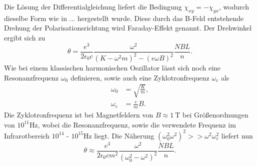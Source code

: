 Die Lösung der Differentialgleichung liefert die Bedingung $\chi_{xy} = -\chi_{yx}$, wodurch dieselbe Form wie in ... hergestellt wurde.
Diese durch das B-Feld entstehende Drehung der Polarisationsrichtung wird Faraday-Effekt genannt.
Der Drehwinkel ergibt sich zu
\begin{equation}
\theta = \frac{e^3}{2 \epsilon_0 c} \frac{\omega^2}{(K - \omega^2 m)^2 - (e\omega B)^2} \frac{NBL}{n}.
\end{equation}
Wie bei einem klassischen harmonischen Oszillator lässt sich noch eine Resonanzfrequenz $\omega_0$ definieren, sowie auch eine Zyklotronfrequenz $\omega_c$ als
\begin{align}
\omega_0 &= \sqrt{\frac{K}{m}}, \\
\omega_c &= \frac{e}{m}B.
\end{align}
Die Zyklotronfrequenz ist bei Magnetfeldern von $B \approx \SI{1}{\tesla}$ bei Größenordnungen von $10^{11}\si{\hertz}$, wobei die Resonanzfrequenz, sowie die verwendete Frequenz im
Infrarotbereich $10^{14}$ - $10^{15}\si{\hertz}$ liegt. Die Näherung $(\omega^2_0 \omega^2)^2 >> \omega^2\omega^2_c$ liefert nun
\begin{equation}
    \theta \approx \frac{e^3}{2 \epsilon_0 c m^2} \frac{\omega^2}{(\omega^2_0 -\omega^2)^2} \frac{NBL}{n}.
\end{equation}
